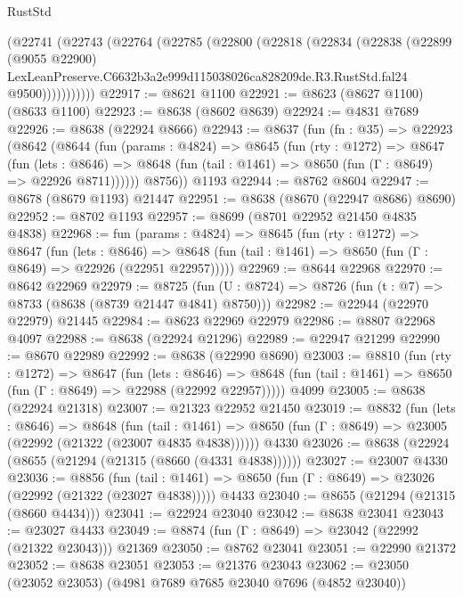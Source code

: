 \begin{lexlean}{RustStd}
\begin{coremodule}
        (@22741
          (@22743
            (@22764
              (@22785
                (@22800
                  (@22818
                    (@22834
                      (@22838
                        (@22899
                          (@9055 @22900)
                          LexLeanPreserve.C6632b3a2e999d115038026ca828209de.R3.RustStd.fal24
                          @9500)))))))))))
@22917 := @8621 @1100
@22921 := @8623 (@8627 @1100) (@8633 @1100)
@22923 := @8638 (@8602 @8639)
@22924 := @4831 @7689
@22926 := @8638 (@22924 @8666)
@22943 := @8637
    (fun (fn : @35) =>
    @22923
      (@8642
        (@8644
          (fun (params : @4824) =>
          @8645
            (fun (rty : @1272) =>
            @8647
              (fun (lets : @8646) =>
              @8648 (fun (tail : @1461) => @8650 (fun (Γ : @8649) => @22926 @8711))))))
        @8756))
    @1193
@22944 := @8762 @8604
@22947 := @8678 (@8679 @1193) @21447
@22951 := @8638 (@8670 (@22947 @8686) @8690)
@22952 := @8702 @1193
@22957 := @8699 (@8701 @22952 @21450 @4835 @4838)
@22968 := fun (params : @4824) =>
  @8645
    (fun (rty : @1272) =>
    @8647
      (fun (lets : @8646) =>
      @8648 (fun (tail : @1461) => @8650 (fun (Γ : @8649) => @22926 (@22951 @22957)))))
@22969 := @8644 @22968
@22970 := @8642 @22969
@22979 := @8725
    (fun (U : @8724) => @8726 (fun (t : @7) => @8733 (@8638 (@8739 @21447 @4841) @8750)))
@22982 := @22944 (@22970 @22979) @21445
@22984 := @8623 @22969 @22979
@22986 := @8807 @22968 @4097
@22988 := @8638 (@22924 @21296)
@22989 := @22947 @21299
@22990 := @8670 @22989
@22992 := @8638 (@22990 @8690)
@23003 := @8810
    (fun (rty : @1272) =>
    @8647
      (fun (lets : @8646) =>
      @8648 (fun (tail : @1461) => @8650 (fun (Γ : @8649) => @22988 (@22992 @22957)))))
    @4099
@23005 := @8638 (@22924 @21318)
@23007 := @21323 @22952 @21450
@23019 := @8832
    (fun (lets : @8646) =>
    @8648
      (fun (tail : @1461) =>
      @8650 (fun (Γ : @8649) => @23005 (@22992 (@21322 (@23007 @4835 @4838))))))
    @4330
@23026 := @8638 (@22924 (@8655 (@21294 (@21315 (@8660 (@4331 @4838))))))
@23027 := @23007 @4330
@23036 := @8856
    (fun (tail : @1461) => @8650 (fun (Γ : @8649) => @23026 (@22992 (@21322 (@23027 @4838)))))
    @4433
@23040 := @8655 (@21294 (@21315 (@8660 @4434)))
@23041 := @22924 @23040
@23042 := @8638 @23041
@23043 := @23027 @4433
@23049 := @8874 (fun (Γ : @8649) => @23042 (@22992 (@21322 @23043))) @21369
@23050 := @8762 @23041
@23051 := @22990 @21372
@23052 := @8638 @23051
@23053 := @21376 @23043
@23062 := @23050 (@23052 @23053) (@4981 @7689 @7685 @23040 @7696 (@4852 @23040))

\end{coremodule}
\end{lexlean}
